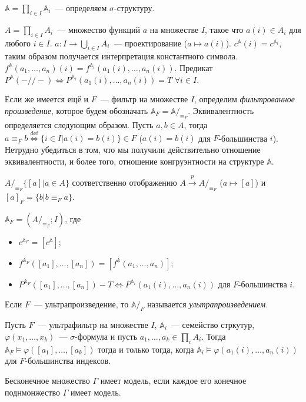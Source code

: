 \begin{definition}
    $\mathbb{A} = \prod_{i \in I} \mathbb{A}_i$~— определяем $\sigma$-структуру.  
    
    $A = \prod_{i \in I} A_i$~— множество функций $a$ на множестве $I$, такое что $a(i) \in A_i$ для любого $i \in I$. $a : I \to \bigcup_{i \in I} A_i$~— проектирование ($a \mapsto a(i)$). $c^{\mathbb{A}}(i) = c^{\mathbb{A}_i}$, таким образом получается интерпретация константного символа. $f^{\mathbb{A}}(a_1, \ldots, a_n)(i) = f^{\mathbb{A}_i}(a_1(i), \ldots, a_n(i))$. Предикат $P^{\mathbb{A}}(-//-) \Longleftrightarrow P^{\mathbb{A}_i}(a_1(i), \ldots, a_n(i)) = T$ $\forall i \in I$. 

    Если же имеется ещё и $F$~— фильтр на множестве $I$, определим \textit{фильтрованное произведение}, которое будем обозначать $\mathbb{A}_F = \mathbb{A} /_{\equiv_F}$. Эквивалентность определяется следующим образом. Пусть $a, b \in A$, тогда $a \equiv_F b \overset{\mathrm{def}}{\Longleftrightarrow} \{i \in I | a(i) = b(i)\} \in F$ ($a(i) = b(i)$ для $F$-большинства $i$). Нетрудно убедиться в том, что мы получили действительно отношение эквивалентности, и более того, отношение конгруэнтности на структуре $\mathbb{A}$.  

    $A /_{\equiv_F} \{[a] | a \in A\}$ соответственно отображению $A \xrightarrow{p} A /_{\equiv_F}$ ($a \mapsto [a]$) и $[a]_F = \{b | b \equiv_F a\}$.  
    
    $\mathbb{A}_F = (A /_{\equiv_F}; I)$, где 

    \begin{itemize}
        \item $c^{\mathbb{A}_F} = [c^{\mathbb{A}}]$; 
        \item $f^{\mathbb{A}_F}([a_1], \ldots, [a_n]) = [f^{\mathbb{A}}(a_1, \ldots, a_n)]$; 
        \item $P^{\mathbb{A}_F}([a_1], \ldots, [a_n]) - T \Longleftrightarrow P^{\mathbb{A}_i} (a_1(i), \ldots, a_n(i))$ для $F$-большинства $i$. 
    \end{itemize} 

    Если $F$~— ультрапроизведение, то $\mathbb{A} /_{F}$ называется \textit{ультрапроизведением}.
\end{definition} 

\begin{theorem}[об ультрапроизведениях]
    Пусть $F$~— ультрафильтр на множестве $I$, $\mathbb{A}_i$~— семейство стркутур, $\varphi(x_1, \ldots, x_k)$~— $\sigma$-формула и пусть $a_1, \ldots, a_k \in \prod_i A_i$. Тогда $\mathbb{A}_F \models \varphi([a_1], \ldots, [a_k])$ тогда и только тогда, когда $\mathbb{A}_i \models \varphi(a_1(i), \ldots, a_n(i))$ для $F$-большинства индексов.
\end{theorem} 

\begin{theorem}
    Бесконечное множество $\Gamma$ имеет модель, если каждое его конечное поднмонжество $\Gamma$ имеет модель.
\end{theorem}



